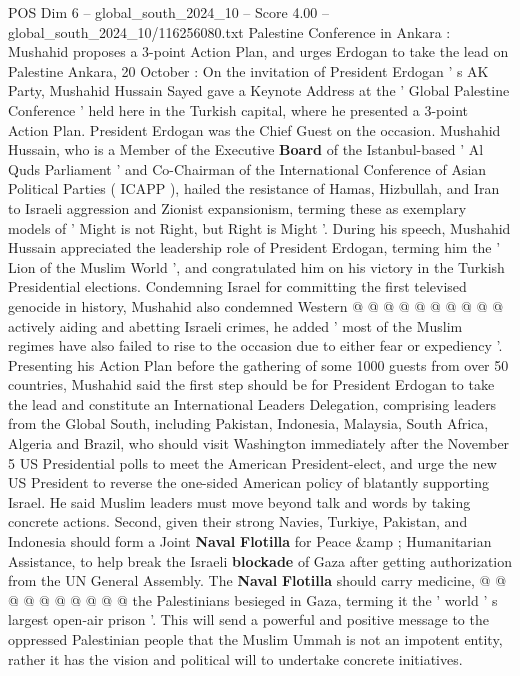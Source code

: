 \begin{textsample}{POS Dim 6 – global\_south\_2024\_10 – Score 4.00 – global\_south\_2024\_10/116256080.txt}  \label{ex:f6_pos_404}
Palestine Conference in Ankara : Mushahid proposes a 3-point Action Plan, and urges Erdogan to take the lead on Palestine Ankara, 20 October : On the invitation of President Erdogan ' s AK Party, Mushahid Hussain Sayed gave a Keynote Address at the ' Global Palestine Conference ' held here in the Turkish capital, where he presented a 3-point Action Plan.
President Erdogan was the Chief Guest on the occasion.
Mushahid Hussain, who is a Member of the Executive \textbf{Board} of the Istanbul-based ' Al Quds Parliament ' and Co-Chairman of the International Conference of Asian Political Parties ( ICAPP ), hailed the resistance of Hamas, Hizbullah, and Iran to Israeli aggression and Zionist expansionism, terming these as exemplary models of ' Might is not Right, but Right is Might '.
During his speech, Mushahid Hussain appreciated the leadership role of President Erdogan, terming him the ' Lion of the Muslim World ', and congratulated him on his victory in the Turkish Presidential elections.
Condemning Israel for committing the first televised genocide in history, Mushahid also condemned Western @ @ @ @ @ @ @ @ @ @ actively aiding and abetting Israeli crimes, he added ' most of the Muslim regimes have also failed to rise to the occasion due to either fear or expediency '.
Presenting his Action Plan before the gathering of some 1000 guests from over 50 countries, Mushahid said the first step should be for President Erdogan to take the lead and constitute an International Leaders Delegation, comprising leaders from the Global South, including Pakistan, Indonesia, Malaysia, South Africa, Algeria and Brazil, who should visit Washington immediately after the November 5 US Presidential polls to meet the American President-elect, and urge the new US President to reverse the one-sided American policy of blatantly supporting Israel.
He said Muslim leaders must move beyond talk and words by taking concrete actions.
Second, given their strong Navies, Turkiye, Pakistan, and Indonesia should form a Joint \textbf{Naval} \textbf{Flotilla} for Peace \&amp ; Humanitarian Assistance, to help break the Israeli \textbf{blockade} of Gaza after getting authorization from the UN General Assembly.
The \textbf{Naval} \textbf{Flotilla} should carry medicine, @ @ @ @ @ @ @ @ @ @ the Palestinians besieged in Gaza, terming it the ' world ' s largest open-air prison '.
This will send a powerful and positive message to the oppressed Palestinian people that the Muslim Ummah is not an impotent entity, rather it has the vision and political will to undertake concrete initiatives.

\end{textsample}
